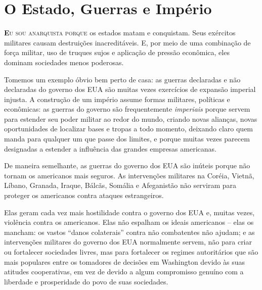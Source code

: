 
\chapter{O Estado, Guerras e Império}
\label{chap:4}

\lettrine[lines=2]{\textcolor{LettrineColor}{\textbf{E}}}{u sou anarquista porque} os estados matam e conquistam. Seus exércitos militares causam destruições inacreditáveis. E, por meio de uma combinação de força militar, uso de truques sujos e aplicação de pressão econômica, eles dominam sociedades menos poderosas.

Tomemos um exemplo óbvio bem perto de casa: as guerras declaradas e não declaradas do governo dos EUA são muitas vezes exercícios de expansão imperial injusta. A construção de um império assume formas militares, políticas e econômicas: as guerras do governo são frequentemente \emph{imperiais} porque servem para estender seu poder militar ao redor do mundo, criando novas alianças, novas oportunidades de localizar bases e tropas a todo momento, deixando claro quem manda para qualquer um que passe dos limites, e porque muitas vezes parecem designadas a estender a influência das grandes empresas americanas.

De maneira semelhante, as guerras do governo dos EUA são inúteis porque não tornam os americanos mais seguros. As intervenções militares na Coréia, Vietnã, Líbano, Granada, Iraque, Bálcãs, Somália e Afeganistão não serviram para proteger os americanos contra ataques estrangeiros.

Elas geram cada vez mais hostilidade contra o governo dos EUA e, muitas vezes, violência contra os americanos. Elas não espalham os ideais americanos -- elas os mancham: os vastos ``danos colaterais'' contra não combatentes não ajudam; e as intervenções militares do governo dos EUA normalmente servem, não para criar ou fortalecer sociedades livres, mas para fortalecer os regimes autoritários que são mais populares entre os tomadores de decisões em Washington devido às suas atitudes cooperativas, em vez de devido a algum compromisso genuíno com a liberdade e prosperidade do povo de suas sociedades.

